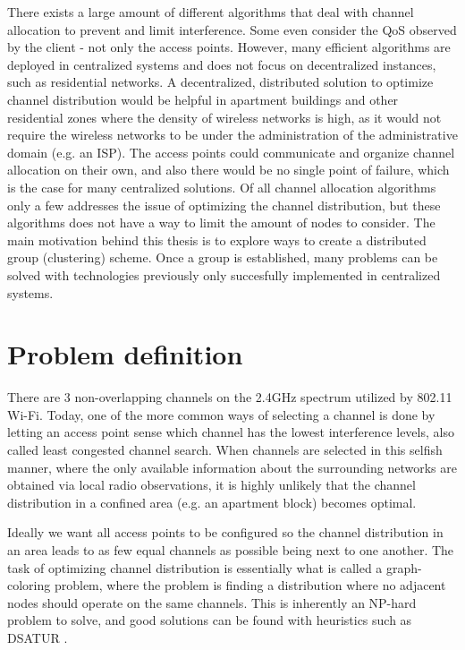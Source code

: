 There exists a large amount of different algorithms that deal with channel allocation to prevent and limit interference. Some even consider the QoS observed by the client - not only the access points.
However, many efficient algorithms are deployed in centralized systems and does not focus on decentralized instances, such as residential networks.
A decentralized, distributed solution to optimize channel distribution would be helpful in apartment buildings and other residential zones where the density of wireless networks is high,
as it would not require the wireless networks to be under the administration of the administrative domain (e.g. an ISP). The access points could communicate and organize channel allocation
on their own, and also there would be no single point of failure, which is the case for many centralized solutions. Of all channel allocation algorithms only a few addresses the issue of optimizing the channel distribution, but these algorithms does not have a way to limit the amount of nodes to consider. The main motivation behind this thesis is to explore ways to create a distributed group (clustering) scheme. Once a group is established, many problems can be solved with technologies previously only succesfully implemented in centralized systems.

\section{Problem definition}
There are 3 non-overlapping channels on the 2.4GHz spectrum utilized by 802.11 Wi-Fi. Today, one of the more common ways of selecting a channel
is done by letting an access point sense which channel has the lowest interference levels, also called least congested channel search.
When channels are selected in this selfish manner, where the only available information about the surrounding networks are obtained via
local radio observations, it is highly unlikely that the channel distribution in a confined area (e.g. an apartment block) becomes optimal.  

Ideally we want all access points to be configured so the channel distribution in an area leads to as few equal channels as possible
being next to one another. The task of optimizing channel distribution is essentially what is called a graph-coloring problem, where the problem is
finding a distribution where no adjacent nodes should operate on the same channels. This is inherently an NP-hard problem to solve, and good solutions can be found with heuristics such as DSATUR \cite{Brelaz}.

